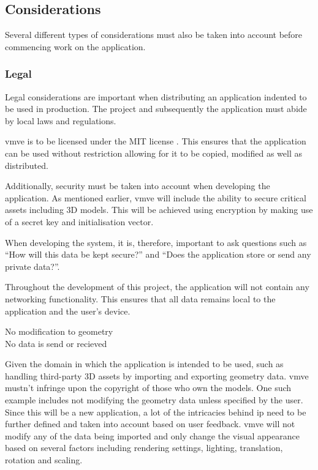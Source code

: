 \documentclass[11pt]{article}
\begin{document}


\subsection{Considerations}
Several different types of considerations must also be taken into account before
commencing work on the application.

\subsubsection{Legal}
Legal considerations are important when distributing an application indented to
be used in production. The project and subsequently the application must abide by
local laws and regulations.

\gls*{vmve} is to be licensed under the MIT license \cite{mit}. This ensures
that the application can be used without restriction allowing for it to be
copied, modified as well as distributed.

Additionally, security must be taken into account when developing the
application. As mentioned earlier, \gls*{vmve} will include the ability to
secure critical assets including 3D models. This will be achieved using
encryption by making use of a secret key and initialisation vector.

When developing the system, it is, therefore, important to ask questions such as
``How will this data be kept secure?'' and ``Does the application store or send
any private data?''. 

Throughout the development of this project, the application will not contain any
networking functionality. This ensures that all data remains local to the
application and the user's device.

\begin{description}
  \item[No modification to geometry] 
  \item[No data is send or recieved] 
\end{description}

Given the domain in which the application is intended to be used, such as
handling third-party 3D assets by importing and exporting geometry data.
\gls*{vmve} mustn't infringe upon the copyright of those who own the models. One
such example includes not modifying the geometry data unless specified by the
user. Since this will be a new application, a lot of the intricacies behind
\gls*{ip} need to be further defined and taken into account based on user
feedback. \gls*{vmve} will not modify any of the data being imported and only
change the visual appearance based on several factors including rendering
settings, lighting, translation, rotation and scaling. 
\end{document}
